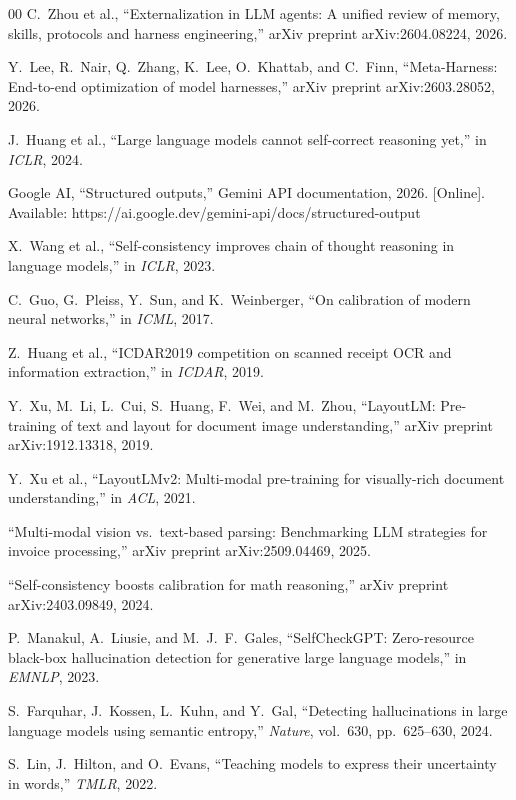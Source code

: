 \documentclass[conference]{IEEEtran}
\begin{document}
\begin{thebibliography}{00}
 C.~Zhou et al., ``Externalization in LLM agents: A unified review of memory, skills, protocols and harness engineering,'' arXiv preprint arXiv:2604.08224, 2026.

 Y.~Lee, R.~Nair, Q.~Zhang, K.~Lee, O.~Khattab, and C.~Finn, ``Meta-Harness: End-to-end optimization of model harnesses,'' arXiv preprint arXiv:2603.28052, 2026.

 J.~Huang et al., ``Large language models cannot self-correct reasoning yet,'' in \emph{ICLR}, 2024.

 Google AI, ``Structured outputs,'' Gemini API documentation, 2026. [Online]. Available: https://ai.google.dev/gemini-api/docs/structured-output

 X.~Wang et al., ``Self-consistency improves chain of thought reasoning in language models,'' in \emph{ICLR}, 2023.

 C.~Guo, G.~Pleiss, Y.~Sun, and K.~Weinberger, ``On calibration of modern neural networks,'' in \emph{ICML}, 2017.

 Z.~Huang et al., ``ICDAR2019 competition on scanned receipt OCR and information extraction,'' in \emph{ICDAR}, 2019.

 Y.~Xu, M.~Li, L.~Cui, S.~Huang, F.~Wei, and M.~Zhou, ``LayoutLM: Pre-training of text and layout for document image understanding,'' arXiv preprint arXiv:1912.13318, 2019.

 Y.~Xu et al., ``LayoutLMv2: Multi-modal pre-training for visually-rich document understanding,'' in \emph{ACL}, 2021.

 ``Multi-modal vision vs.\ text-based parsing: Benchmarking LLM strategies for invoice processing,'' arXiv preprint arXiv:2509.04469, 2025.

 ``Self-consistency boosts calibration for math reasoning,'' arXiv preprint arXiv:2403.09849, 2024.

 P.~Manakul, A.~Liusie, and M.~J.~F.~Gales, ``SelfCheckGPT: Zero-resource black-box hallucination detection for generative large language models,'' in \emph{EMNLP}, 2023.

 S.~Farquhar, J.~Kossen, L.~Kuhn, and Y.~Gal, ``Detecting hallucinations in large language models using semantic entropy,'' \emph{Nature}, vol.~630, pp.~625--630, 2024.

 S.~Lin, J.~Hilton, and O.~Evans, ``Teaching models to express their uncertainty in words,'' \emph{TMLR}, 2022.


\end{thebibliography}
\end{document}

